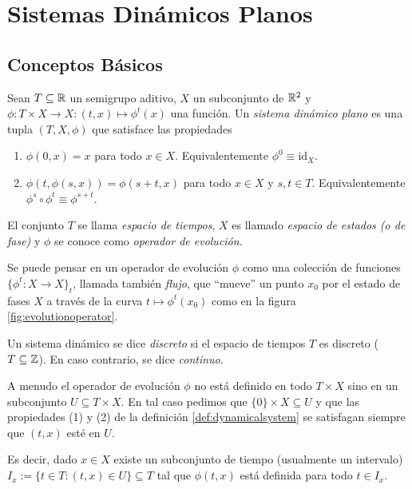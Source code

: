 \chapter{Sistemas Dinámicos Planos}
\label{cap:sistemasplanosautonomos}

\section{Conceptos Básicos} \label{sec:conceptosbasicos}

\begin{definition} \label{def:dynamicalsystem}
Sean $T \subseteq {\ensuremath{\mathbb{R}}}$ un semigrupo aditivo, $X$ un subconjunto de ${\mathbb{R}}^2$ y $\phi: T \times X \to X: (t,x) \mapsto \phi^t(x)$ una función. Un \emph{sistema dinámico plano} es una tupla $(T, X, \phi)$ que satisface las propiedades

\begin{enumerate}[(1)]
    \item $\phi \left( 0, x \right) = x$ para todo $x \in
    X$. Equivalentemente $\phi^0 \equiv \text{id}_X$.
    
    \item $\phi \left( t, \phi \left( s, x \right) \right) = \phi \left(
    s + t, x \right)$ para todo $x \in X$ y $s, t \in T$. Equivalentemente $\phi^{s} \circ \phi^{t} \equiv \phi^{s + t}$.
\end{enumerate}

El conjunto $T$ se llama \emph{espacio de tiempos}, $X$ es llamado {\emph{espacio de estados (o de fase)}} y $\phi$ se conoce como {\emph{operador de evoluci\'on}}.
\end{definition}

Se puede pensar en un operador de evolución $\phi$ como una colección de funciones $\{ \phi^t: X \to X \}_t$, llamada también \emph{flujo}, que ``mueve'' un punto $x_0$ por el estado de fases $X$ a través de la curva $t \mapsto \phi^t(x_0)$ como en la figura \ref{fig:evolutionoperator}.

\begin{remark}
Un sistema dinámico se dice \emph{discreto} si el espacio de tiempos $T$ es discreto ($T \subseteq {\ensuremath{\mathbb{Z}}}$). En caso contrario, se dice \emph{continuo}.
\end{remark}

\begin{remark}
A menudo el operador de evolución $\phi$ no está definido en todo $T \times X$ sino en un subconjunto $U \subseteq T \times X$. En tal caso pedimos que $\{ 0 \} \times X \subseteq U$ y que las propiedades (1) y (2) de la definición \ref{def:dynamicalsystem} se satisfagan siempre que $(t, x)$ esté en $U$.

Es decir, dado $x \in X$ existe un subconjunto de tiempo (usualmente un intervalo) $I_x := \{ t \in T : (t,x) \in U \} \subseteq T$ tal que $\phi(t,x)$ está definida para todo $t \in I_x$.
\end{remark}

